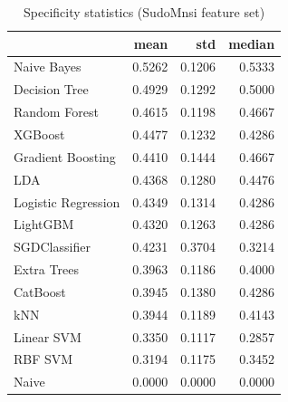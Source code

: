 \begin{table}
\caption{Specificity statistics (SudoMnsi feature set)}
\label{tab:specificity_SudoMnsi_stats}
\begin{tabular}{lrrr}
\toprule
 & mean & std & median \\
\midrule
Naive Bayes & 0.5262 & 0.1206 & 0.5333 \\
Decision Tree & 0.4929 & 0.1292 & 0.5000 \\
Random Forest & 0.4615 & 0.1198 & 0.4667 \\
XGBoost & 0.4477 & 0.1232 & 0.4286 \\
Gradient Boosting & 0.4410 & 0.1444 & 0.4667 \\
LDA & 0.4368 & 0.1280 & 0.4476 \\
Logistic Regression & 0.4349 & 0.1314 & 0.4286 \\
LightGBM & 0.4320 & 0.1263 & 0.4286 \\
SGDClassifier & 0.4231 & 0.3704 & 0.3214 \\
Extra Trees & 0.3963 & 0.1186 & 0.4000 \\
CatBoost & 0.3945 & 0.1380 & 0.4286 \\
kNN & 0.3944 & 0.1189 & 0.4143 \\
Linear SVM & 0.3350 & 0.1117 & 0.2857 \\
RBF SVM & 0.3194 & 0.1175 & 0.3452 \\
Naive & 0.0000 & 0.0000 & 0.0000 \\
\bottomrule
\end{tabular}
\end{table}
